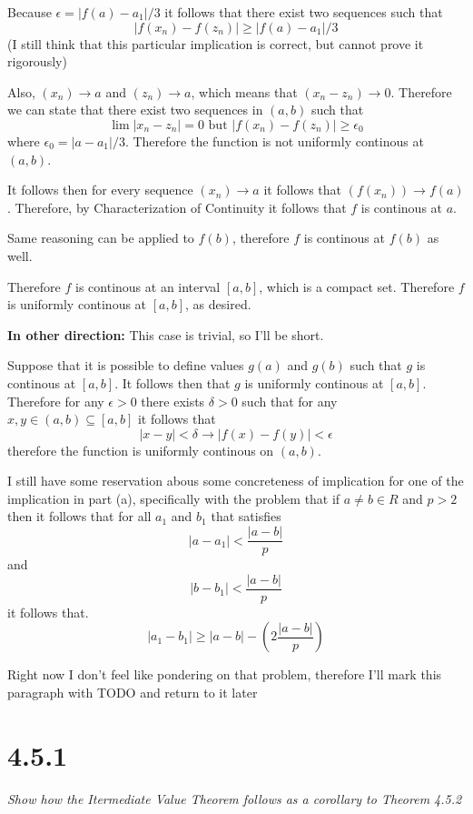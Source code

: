 \documentclass[11pt,oneside,titlepage]{book}
\begin{document}
Because $\epsilon = |f(a) - a_1| / 3$ it  follows that there exist
two sequences such that 
$$|f(x_n) - f(z_n)| \geq |f(a) - a_1| / 3$$
(I still think that this particular implication is correct, but cannot
prove it rigorously)

Also, $(x_n) \to a$ and $(z_n) \to a$, which means that
$(x_n - z_n) \to 0$. Therefore we can state that there exist two sequences in
$(a, b)$ such that 
$$\lim|x_n - z_n| = 0 \text{ but } |f(x_n) - f(z_n)| \geq \epsilon_0$$
where $\epsilon_0 = |a - a_1| / 3$. Therefore the function is not uniformly
continous at $(a, b)$.

It follows then for every sequence $(x_n) \to a$ it follows that
$(f(x_n)) \to f(a)$. Therefore, by Characterization of Continuity it follows
that $f$ is continous at $a$.

Same reasoning can be applied to $f(b)$, therefore $f$ is continous at
$f(b)$ as well.

Therefore $f$ is continous at an interval $[a, b]$, which is a compact set.
Therefore $f$ is uniformly continous at $[a, b]$, as desired.


\textbf{In other direction: }
This case is trivial, so I'll be short.

Suppose that it is possible to define values $g(a)$ and $g(b)$ such that
$g$ is continous at $[a, b]$. It follows then that $g$ is uniformly continous
at $[a, b]$. Therefore for any $\epsilon > 0$ there exists $\delta > 0$
such that for any $x, y \in (a, b) \subseteq [a, b]$
it follows that
$$|x - y| < \delta \to |f(x) - f(y)| < \epsilon$$
therefore the function is uniformly continous on $(a, b)$.

I still have some reservation abous some concreteness of implication for
one of the implication in part (a), specifically with
the problem that if $a \neq b \in R$ and $p > 2$  then it follows that
for all $a_1$ and $b_1$ that satisfies
$$|a - a_1| < \frac{|a - b|}{p}$$
and
$$|b - b_1| < \frac{|a - b|}{p}$$
it follows that.
$$|a_1 - b_1| \geq |a - b| - (2 \frac{|a - b|}{p})$$


Right now I don't feel like pondering on that problem, therefore I'll
mark this paragraph with TODO and return to it later

\section*{4.5.1}
\textit{Show how the Itermediate Value Theorem follows as a corollary
  to Theorem 4.5.2}
\end{document}
